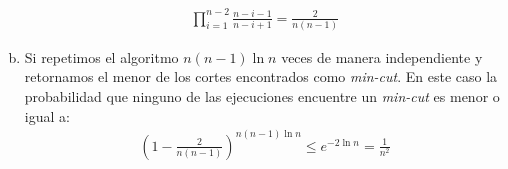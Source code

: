 \documentclass[dcc,uchile]{fcfmcourse}
\theoremstyle{plain}
\theoremstyle{definition}
\begin{document}
\begin{problems}
\begin{enumerate}[a)]
\begin{align*}
    \prod_{i = 1}^{n-2} \frac{n-i-1}{n-i+1} = \frac{2}{n(n-1)}
\end{align*}
\item Si repetimos el algoritmo $n(n-1)\ln{n}$ veces de manera independiente y retornamos el menor de los cortes encontrados como \textit{min-cut}. En este caso la probabilidad que ninguno de las ejecuciones encuentre un \textit{min-cut} es menor o igual a:
\begin{align*}
    \left(1-\frac{2}{n(n-1)}\right)^{n(n-1)\ln{n}}\le e^{-2\ln{n}} = \frac{1}{n^2}
\end{align*}
\end{enumerate}
\end{problems}
\end{document}

